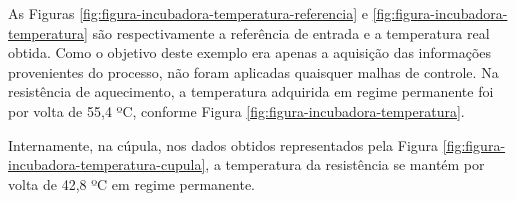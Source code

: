         \begin{figure}[!h]
    	\end{figure}
    	
As Figuras \ref{fig:figura-incubadora-temperatura-referencia} e \ref{fig:figura-incubadora-temperatura} são respectivamente a referência de entrada e a temperatura real obtida. Como o objetivo deste exemplo era apenas a aquisição das informações provenientes do processo, não foram aplicadas quaisquer malhas de controle. Na resistência de aquecimento, a temperatura adquirida em regime permanente foi por volta de 55,4 ºC, conforme Figura \ref{fig:figura-incubadora-temperatura}.

        \begin{figure}[!h]
    	\end{figure}

Internamente, na cúpula, nos dados obtidos representados pela Figura \ref{fig:figura-incubadora-temperatura-cupula}, a temperatura da resistência se mantém por volta de 42,8 ºC em regime permanente.

